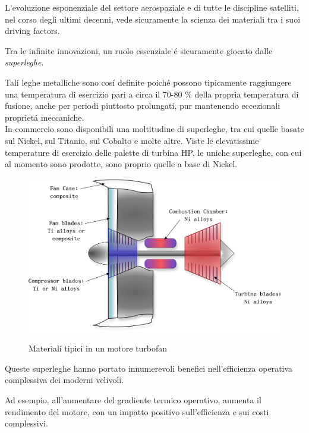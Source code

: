 \documentclass{article}
\begin{document}
    L'evoluzione esponenziale del settore aerospaziale e di tutte le discipline satelliti, 
    nel corso degli ultimi decenni, vede sicuramente la scienza dei materiali 
    tra i suoi driving factors.

    Tra le infinite innovazioni, un ruolo essenziale é sicuramente giocato dalle \textit{superleghe}.

    Tali leghe metalliche sono cosí definite poiché possono tipicamente raggiungere
    una temperatura di esercizio pari a circa il 70-80 \% della propria temperatura di 
    fusione, anche per periodi piuttosto prolungati, pur mantenendo eccezionali
    proprietá meccaniche.
    \\ 

    In commercio sono disponibili una moltitudine di superleghe, tra cui quelle basate 
    sul Nickel, sul Titanio, sul Cobalto e molte altre.
    Viste le elevatissime temperature di esercizio delle palette di turbina HP, le
    uniche superleghe, con cui al momento sono prodotte, sono proprio quelle a base di Nickel. 
    
    \begin{figure}[h!]
        \centering
         \label{turbofan_drawing}
        \includegraphics[width=0.95 \textwidth]{Sources/engine_drawing.eps}
        \caption{Materiali tipici in un motore turbofan \autocite{Inkscape}}
    \end{figure}

    Queste superleghe hanno portato innumerevoli benefici nell'efficienza operativa
    complessiva dei moderni velivoli.

    Ad esempio, all'aumentare del gradiente termico operativo, aumenta il rendimento del motore, 
    con un impatto positivo sull'efficienza e sui costi complessivi.
\end{document}
